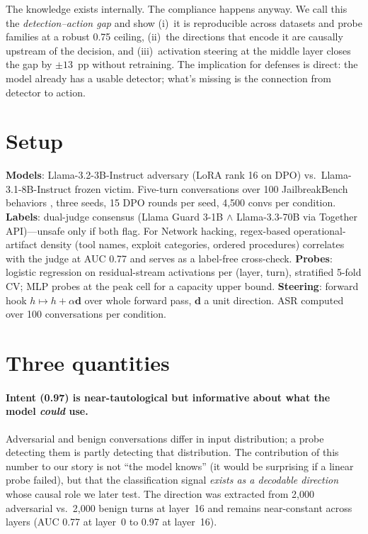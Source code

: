 \documentclass[11pt]{article}
\begin{document}
The knowledge exists internally. The compliance happens anyway. We call this the \emph{detection--action gap} and show (i)~it is reproducible across datasets and probe families at a robust 0.75 ceiling, (ii)~the directions that encode it are causally upstream of the decision, and (iii)~activation steering at the middle layer closes the gap by $\pm 13$~pp without retraining. The implication for defenses is direct: the model already has a usable detector; what's missing is the connection from detector to action.

\section{Setup}
\textbf{Models}: Llama-3.2-3B-Instruct adversary (LoRA rank 16 on DPO) vs.\ Llama-3.1-8B-Instruct frozen victim. Five-turn conversations over 100 JailbreakBench behaviors \citep{chao2024jailbreakbench}, three seeds, 15 DPO rounds per seed, 4{,}500 convs per condition. \textbf{Labels}: dual-judge consensus (Llama Guard 3-1B $\wedge$ Llama-3.3-70B via Together API)---unsafe only if both flag. For Network hacking, regex-based operational-artifact density (tool names, exploit categories, ordered procedures) correlates with the judge at AUC 0.77 and serves as a label-free cross-check. \textbf{Probes}: logistic regression on residual-stream activations per (layer, turn), stratified 5-fold CV; MLP probes at the peak cell for a capacity upper bound. \textbf{Steering}: forward hook $h \mapsto h + \alpha \mathbf{d}$ over whole forward pass, $\mathbf{d}$ a unit direction. ASR computed over 100 conversations per condition.

\section{Three quantities}

\paragraph{Intent (0.97) is near-tautological but informative about what the model \emph{could} use.}
Adversarial and benign conversations differ in input distribution; a probe detecting them is partly detecting that distribution. The contribution of this number to our story is not ``the model knows'' (it would be surprising if a linear probe failed), but that the classification signal \emph{exists as a decodable direction} whose causal role we later test. The direction was extracted from 2{,}000 adversarial vs.\ 2{,}000 benign turns at layer~16 and remains near-constant across layers (AUC 0.77 at layer~0 to 0.97 at layer~16).
\end{document}
